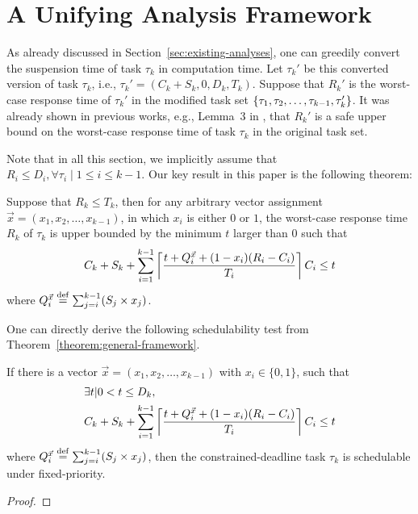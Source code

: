 \section{A Unifying Analysis Framework}
\label{sec:analysis}


As already discussed in Section~\ref{sec:existing-analyses}, one can greedily convert the suspension time of task $\tau_k$ in computation time. Let $\tau_k'$ be this converted version of task $\tau_k$, i.e., $\tau_k' = (C_k + S_k, 0, D_k, T_k)$.  Suppose that $R_k'$ is the worst-case response time of $\tau_k'$ in the modified task set $\left\{{\tau_1, \tau_2, \ldots, \tau_{k-1}, \tau_k'}\right\}$. It was already shown in previous works, e.g., Lemma~3 in
\cite{Liu_2014}, that $R_k'$ is a safe upper bound on the worst-case response time of task $\tau_k$ in the original task set.

Note that in all this section, we implicitly assume that $R_i
\leq D_i, \forall \tau_i \mid 1 \leq i \leq k-1$.  Our key result in
this paper is the following theorem:

\begin{theorem}
   \label{theorem:general-framework}
   Suppose that $R_k \leq T_k$, then for any arbitrary vector assignment $\vec{x} = (x_1, x_2, \ldots, x_{k-1})$, in which $x_i$ is either $0$ or $1$, the worst-case
   response time $R_k$ of $\tau_k$ is upper bounded by the minimum $t$ larger than $0$ such that 
   {\small \begin{equation} \label{eq:TDA-suspension-tighter0} 
       C_k + S_k + \sum_{i=1}^{k-1}\ceiling{\frac{t+Q_i^{\vec{x}}+(1-x_i)(R_i-C_i)}{T_i}} C_i \leq t
     \end{equation}}where $Q_i^{\vec{x}} \stackrel{\mathrm{def}}{=} \sum_{j=i}^{k-1} (S_j \times x_j)$.
 \end{theorem} 
 One can directly derive the
 following schedulability test from Theorem~\ref{theorem:general-framework}.

 \begin{Corollary}
   \label{corollary:general-framework}
   If there is a vector $\vec{x} = (x_1, x_2, \ldots,
   x_{k-1})$ with $x_i \in \{ 0, 1\}$, such that 
   {\small \begin{align} 
   \label{eq:TDA-suspension-tighter} 
       & \exists t | 0 < t \leq D_k,  \nonumber \\
       & C_k + S_k + \sum_{i=1}^{k-1}\ceiling{\frac{t+Q_i^{\vec{x}}+(1-x_i)(R_i-C_i)}{T_i}} C_i \leq t
     \end{align}}
     where $Q_i^{\vec{x}} \stackrel{\mathrm{def}}{=} \sum_{j=i}^{k-1} (S_j \times x_j)$, then the constrained-deadline task $\tau_k$ is schedulable under fixed-priority.
 \end{Corollary}
 \begin{proof}
 \end{proof}
 
